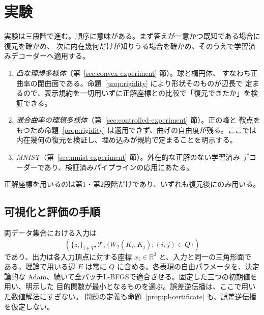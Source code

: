 \section{実験}
\label{sec:experiments}

実験は三段階で進む。順序に意味がある。まず答えが一意かつ既知である場合に復元を確かめ、
次に内在幾何だけが知りうる場合を確かめ、そのうえで学習済みデコーダーへ適用する。

\begin{enumerate}
  \item \emph{凸な理想多様体}（第~\ref{sec:convex-experiment} 節）。球と楕円体、
  すなわち正曲率の閉曲面である。命題~\ref{prop:rigidity} により形状そのものが辺長で
  定まるので、表示規約を一切用いずに正解座標との比較で「復元できたか」を検証できる。
  \item \emph{混合曲率の理想多様体}（第~\ref{sec:controlled-experiment} 節）。正の峰と
  鞍点をもつため命題~\ref{prop:rigidity} は適用できず、曲げの自由度が残る。ここでは
  内在幾何の復元を検証し、埋め込みが規約で定まることを明示する。
  \item \emph{MNIST}（第~\ref{sec:mnist-experiment} 節）。外在的な正解のない学習済み
  デコーダーであり、検証済みパイプラインの応用にあたる。
\end{enumerate}
正解座標を用いるのは第1・第2段階だけであり、いずれも復元後にのみ用いる。

\subsection{可視化と評価の手順}

両データ集合における入力は
\begin{equation}
 (\{z_i\}_{i\in V},\mathcal T,
   \{W_2(K_i,K_j):(i,j)\in Q\})
 \label{eq:experiment-input}
\end{equation}
であり、出力は各入力頂点に対する座標 $x_i\in\mathbb R^3$ と、入力と同一の三角形面で
ある。理論で用いる辺 $E$ は常に $Q$ に含める。各表現の自由パラメータを、決定論的な
Adam、続いて全バッチL-BFGSで適合させる。固定した三つの初期値を用い、明示した
目的関数が最小となるものを選ぶ。誤差逆伝播は、ここで用いた数値解法にすぎない。
問題の定義も命題~\ref{prop:pl-certificate} も、誤差逆伝播を仮定しない。

